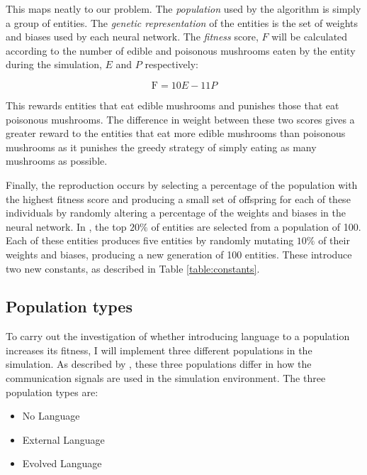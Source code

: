 \documentclass[12pt,a4paper,twoside,openright]{report}
\begin{document}
This maps neatly to our problem. The \emph{population} used by the algorithm is simply a group of entities. The \emph{genetic representation} of the entities is the set of weights and biases used by each neural network. The \emph{fitness} score, $F$ will be calculated according to the number of edible and poisonous mushrooms eaten by the entity during the simulation, $E$ and $P$ respectively:

\begin{equation}
\label{equation:fitness}
\mathrm{F} = 10 E- 11 P
\end{equation}

This rewards entities that eat edible mushrooms and punishes those that eat poisonous mushrooms. The difference in weight between these two scores gives a greater reward to the entities that eat more edible mushrooms than poisonous mushrooms as it punishes the greedy strategy of simply eating as many mushrooms as possible.

Finally, the reproduction occurs by selecting a percentage of the population with the highest fitness score and producing a small set of offspring for each of these individuals by randomly altering a percentage of the weights and biases in the neural network. In \cite{Cangelosi1998}, the top $20\%$ of entities are selected from a population of 100. Each of these entities produces five entities by randomly mutating $10\%$ of their weights and biases, producing a new generation of 100 entities. These introduce two new constants, as described in Table \ref{table:constants}.

\subsection{Population types}\label{section:populations}

To carry out the investigation of whether introducing language to a population increases its fitness, I will implement three different populations in the simulation. As described by \cite{Cangelosi1998}, these three populations differ in how the communication signals are used in the simulation environment. The three population types are:

\begin{itemize}
	\item No Language
	\item External Language
	\item Evolved Language
\end{itemize}
\end{document}
